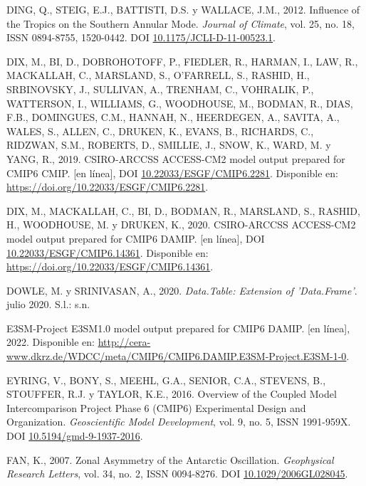 \documentclass[12pt,oneside,a4paper]{reedthesis}
\newlength{\cslhangindent}
\newenvironment{CSLReferences}[2] %
 {%
  \setlength{\parindent}{0pt}
  \ifodd #1 \everypar{\setlength{\hangindent}{\cslhangindent}}\ignorespaces\fi
  \ifnum #2 > 0
  \setlength{\parskip}{#2\baselineskip}
  \fi
 }%
 {}
\begin{document}
\begin{CSLReferences}{1}{0}
\leavevmode{}%
DING, Q., STEIG, E.J., BATTISTI, D.S. y WALLACE, J.M., 2012. Influence of the {Tropics} on the {Southern Annular Mode}. \emph{Journal of Climate}, vol. 25, no. 18, ISSN 0894-8755, 1520-0442. DOI \href{https://doi.org/10.1175/JCLI-D-11-00523.1}{10.1175/JCLI-D-11-00523.1}.

\leavevmode{}%
DIX, M., BI, D., DOBROHOTOFF, P., FIEDLER, R., HARMAN, I., LAW, R., MACKALLAH, C., MARSLAND, S., O'FARRELL, S., RASHID, H., SRBINOVSKY, J., SULLIVAN, A., TRENHAM, C., VOHRALIK, P., WATTERSON, I., WILLIAMS, G., WOODHOUSE, M., BODMAN, R., DIAS, F.B., DOMINGUES, C.M., HANNAH, N., HEERDEGEN, A., SAVITA, A., WALES, S., ALLEN, C., DRUKEN, K., EVANS, B., RICHARDS, C., RIDZWAN, S.M., ROBERTS, D., SMILLIE, J., SNOW, K., WARD, M. y YANG, R., 2019. CSIRO-ARCCSS ACCESS-CM2 model output prepared for CMIP6 CMIP. {[}en línea{]}, DOI \href{https://doi.org/10.22033/ESGF/CMIP6.2281}{10.22033/ESGF/CMIP6.2281}. Disponible en: \url{https://doi.org/10.22033/ESGF/CMIP6.2281}.

\leavevmode{}%
DIX, M., MACKALLAH, C., BI, D., BODMAN, R., MARSLAND, S., RASHID, H., WOODHOUSE, M. y DRUKEN, K., 2020. CSIRO-ARCCSS ACCESS-CM2 model output prepared for CMIP6 DAMIP. {[}en línea{]}, DOI \href{https://doi.org/10.22033/ESGF/CMIP6.14361}{10.22033/ESGF/CMIP6.14361}. Disponible en: \url{https://doi.org/10.22033/ESGF/CMIP6.14361}.

\leavevmode{}%
DOWLE, M. y SRINIVASAN, A., 2020. \emph{Data.Table: {Extension} of 'Data.Frame'}. julio 2020. S.l.: s.n.

\leavevmode{}%
E3SM-Project E3SM1.0 model output prepared for CMIP6 DAMIP. {[}en línea{]}, 2022. Disponible en: \url{http://cera-www.dkrz.de/WDCC/meta/CMIP6/CMIP6.DAMIP.E3SM-Project.E3SM-1-0}.

\leavevmode{}%
EYRING, V., BONY, S., MEEHL, G.A., SENIOR, C.A., STEVENS, B., STOUFFER, R.J. y TAYLOR, K.E., 2016. Overview of the {Coupled Model Intercomparison Project Phase} 6 ({CMIP6}) Experimental Design and Organization. \emph{Geoscientific Model Development}, vol. 9, no. 5, ISSN 1991-959X. DOI \href{https://doi.org/10.5194/gmd-9-1937-2016}{10.5194/gmd-9-1937-2016}.

\leavevmode{}%
FAN, K., 2007. Zonal Asymmetry of the {Antarctic Oscillation}. \emph{Geophysical Research Letters}, vol. 34, no. 2, ISSN 0094-8276. DOI \href{https://doi.org/10.1029/2006GL028045}{10.1029/2006GL028045}.


\end{CSLReferences}
\end{document}
